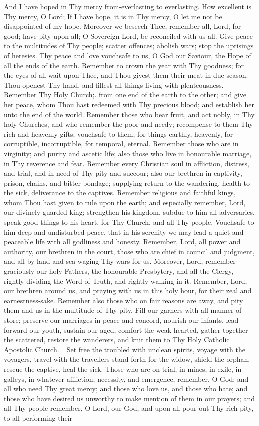 And I have hoped in Thy mercy from‑everlasting to everlasting. How excellent is Thy mercy, O Lord; If I have hope, it is in Thy mercy, O let me not be disappointed of my hope.  Moreover we beseech Thee, remember all, Lord, for good; have pity upon all; O Sovereign Lord, be reconciled with us all. Give peace to the multitudes of Thy people; scatter offences; abolish wars; stop the uprisings of heresies. Thy peace and love vouchsafe to us, O God our Saviour, the Hope of all the ends of the earth. Remember to crown the year with Thy goodness; for the eyes of all wait upon Thee, and Thou givest them their meat in due season. Thou openest Thy hand, and fillest all things living with plenteousness. Remember Thy Holy Church;. from one end of the earth to the other; and give her peace, whom Thou hast redeemed with Thy precious blood;  and establish her unto the end of the world. Remember those who bear fruit, and act nobly, in Thy holy Churches, and who remember the poor and needy; recompense to them Thy rich and heavenly gifts; vouchsafe to them, for things earthly, heavenly, for corruptible, incorruptible, for temporal, eternal. Remember those who are in virginity; and purity and ascetic life; also those who live in honourable marriage, in Thy reverence and fear. Remember every Christian soul in affliction, distress, and trial, and in need of Thy pity and succour; also our brethren in captivity, prison, chains, and bitter bondage; supplying return to the wandering, health to the sick, deliverance to the captives. Remember religious and faithful kings,  whom Thou hast given to rule upon the earth; and especially remember, Lord, our divinely‑guarded king; strengthen his kingdom, subdue to him all adversaries, speak good things to his heart, for Thy Church, and all Thy people. Vouchsafe to him deep and undisturbed peace, that in his serenity we may lead a quiet and peaceable life with all godliness and honesty. Remember, Lord, all power and authority, our brethren in the court, those who are chief in council and judgment, and all by land and sea waging Thy wars for us. Moreover, Lord, remember graciously our holy Fathers, the honourable Presbytery, and all the Clergy, rightly dividing the Word of Truth, and rightly walking in it. Remember, Lord, our brethren around us, and praying with us in this holy hour, for their zeal and earnestness‑sake. Remember also those who on fair reasons are away, and pity them and us in the multitude of Thy pity. Fill our garners with all manner of store; preserve our marriages in peace and concord, nourish our infants, lead forward our youth, sustain our aged, comfort the weak‑hearted, gather together the scattered, restore the wanderers, and knit them to Thy Holy Catholic Apostolic Church. \_Set free the troubled with unclean spirits, voyage with the voyagers, travel with the travellers stand forth for the widow, shield the orphan, rescue the captive, heal the sick. Those who are on trial, in mines, in exile, in galleys, in whatever affliction, necessity, and emergence, remember, O God; and all who need Thy great mercy; and those who love us, and those who hate; and those who have desired us unworthy to make mention of them in our prayers; and all Thy people remember, O Lord, our God, and upon all pour out Thy rich pity, to all performing their 